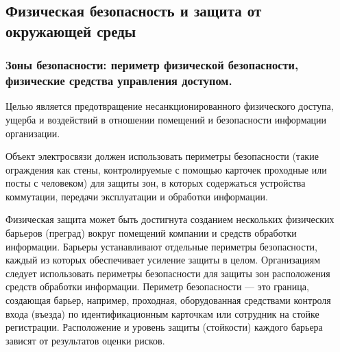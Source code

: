 \documentclass[12pt, russian, oneside, article]{ncc}
\begin{document}
\subsection{Физическая безопасность и защита от окружающей среды}
\label{sec-5_5}
\subsubsection{Зоны безопасности: периметр физической безопасности, физические средства управления доступом.}
\label{sec-5_5_1}


Целью является предотвращение несанкционированного физического доступа, ущерба и воздействий в отношении помещений и безопасности информации организации.

Объект электросвязи должен использовать периметры безопасности (такие ограждения как стены, контролируемые с помощью карточек проходные или посты с человеком) для защиты зон, в которых содержаться устройства коммутации, передачи эксплуатации и обработки информации.

Физическая защита может быть достигнута созданием нескольких физических барьеров (преград) вокруг помещений компании и средств обработки информации. Барьеры устанавливают отдельные периметры безопасности, каждый из которых обеспечивает усиление защиты в целом. Организациям следует использовать периметры безопасности для защиты зон расположения средств обработки информации. Периметр безопасности --- это граница, создающая барьер, например, проходная, оборудованная средствами контроля входа (въезда) по идентификационным карточкам или сотрудник на стойке регистрации. Расположение и уровень защиты (стойкости) каждого барьера зависят от результатов оценки рисков.
\end{document}
